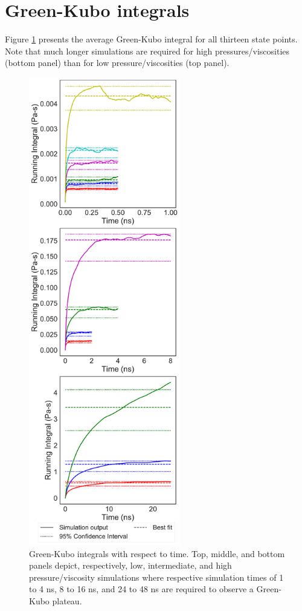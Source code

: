 \documentclass[preprint,review,11pt]{elsarticle}
\begin{document}
\begin{longtable}{|c|c|c|c|c|c|c|c|}
			\end{longtable}
					
	\clearpage
	\newpage
	
	
	\section{Green-Kubo integrals} \label{SI:Running integrals}
		
	Figure \ref{fig:running_integrals} presents the average Green-Kubo integral for all thirteen state points. Note that much longer simulations are required for high pressures/viscosities (bottom panel) than for low pressure/viscosities (top panel). 	
	
	\begin{figure}[htb!]
		\centering
				\includegraphics[width=2.6in]{GreenKubo_integrals.pdf}
		\caption{Green-Kubo integrals with respect to time. Top, middle, and bottom panels depict, respectively, low, intermediate, and high pressure/viscosity simulations where respective simulation times of 1 to 4 ns, 8 to 16 ns, and 24 to 48 ns are required to observe a Green-Kubo plateau.}
		\label{fig:running_integrals}
	\end{figure}
\end{document}
